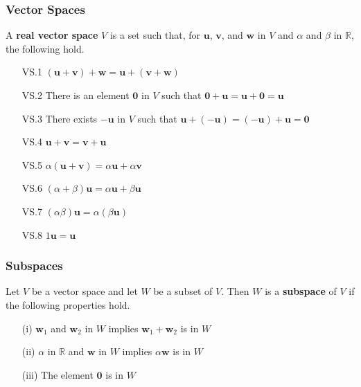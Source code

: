 \documentclass{beamer}
\begin{document}
\begin{frame}
\frametitle{Vector Spaces}
\begin{Definition}
A {\bf real vector space} $V$ is a set such that, for ${\boldsymbol u}$, ${\boldsymbol v}$, and ${\boldsymbol w}$ in $V$ and $\alpha$ and $\beta$ in $\mathbb{R}$, the following hold.
{
\small
\begin{multicols}{2}
\begin{enumerate}
\item[VS.1] $({\boldsymbol u} + {\boldsymbol v}) + {\boldsymbol w} = {\boldsymbol u} + ({\boldsymbol v} + {\boldsymbol w})$
\item[VS.2] There is an element ${\boldsymbol 0}$ in $V$ such that
$
{\boldsymbol 0} + {\boldsymbol u} = {\boldsymbol u} + {\boldsymbol 0} = {\boldsymbol u}
$
\item[VS.3] There exists ${\boldsymbol -}{\boldsymbol u}$ in $V$ such that
$
{\boldsymbol u} + ({\boldsymbol -}{\boldsymbol u}) = ({\boldsymbol -}{\boldsymbol u}) + {\boldsymbol u} = {\boldsymbol 0}
$
\item[VS.4] ${\boldsymbol u} + {\boldsymbol v} = {\boldsymbol v} + {\boldsymbol u}$
\item[VS.5] $\alpha({\boldsymbol u} + {\boldsymbol v}) = \alpha {\boldsymbol u} + \alpha {\boldsymbol v}$
\item[VS.6] $(\alpha + \beta) {\boldsymbol u} = \alpha {\boldsymbol u} + \beta {\boldsymbol u}$
\item[VS.7] $(\alpha\beta) {\boldsymbol u} = \alpha(\beta {\boldsymbol u})$
\item[VS.8] $1 {\boldsymbol u} = {\boldsymbol u}$
\end{enumerate}
\end{multicols}
}
\end{Definition}
\end{frame}

\begin{frame}
\frametitle{Subspaces}
\begin{Definition}
Let $V$ be a vector space and let $W$ be a subset of $V$. Then $W$ is a {\bf subspace} of $V$ if the following properties hold.
\begin{enumerate}
\item[(i)] ${\boldsymbol w_1}$ and ${\boldsymbol w_2}$ in $W$ implies ${\boldsymbol w_1} + {\boldsymbol w_2}$ is in $W$
\item[(ii)] $\alpha$ in $\mathbb{R}$ and ${\boldsymbol w}$ in $W$ implies $\alpha {\boldsymbol w}$ is in $W$
\item[(iii)] The element ${\boldsymbol 0}$ is in $W$
\end{enumerate}
\end{Definition}

\end{frame}
\end{document}
